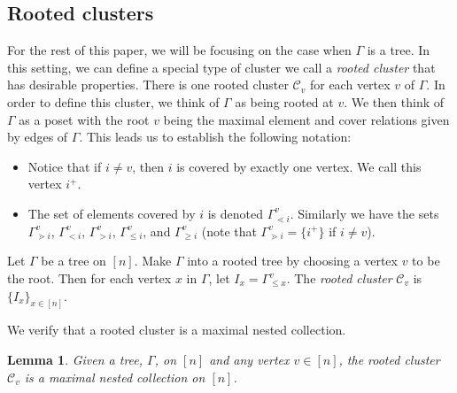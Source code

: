 \documentclass[10pt,a4paper]{amsart}
\numberwithin{equation}{section}
\newtheorem{Lemma}[Theorem]{Lemma}
\newcommand{\calC}{\mathcal{C}}
\begin{document}
\subsection{Rooted clusters}\label{sec:rooted-clusters}
For the rest of this paper, we will be focusing on the case when $\Gamma$ is a tree. In this setting, we can define a special type of cluster we call a \emph{rooted cluster} that has desirable properties. There is one rooted cluster $\calC_v$ for each vertex $v$ of $\Gamma$. In order to define this cluster, we think of $\Gamma$ as being rooted at $v$. We then think of $\Gamma$ as a poset with the root $v$ being the maximal element and cover relations given by edges of $\Gamma$. This leads us to establish the following notation:
\begin{itemize}\itemsep=0pt
 \item Notice that if $i\neq v$, then $i$ is covered by exactly one vertex. We call this vertex $i^+$.
 \item The set of elements covered by $i$ is denoted $\Gamma_{\lessdot i}^v$. Similarly we have the sets $\Gamma_{\gtrdot i}^v$, $\Gamma_{< i}^v$, $\Gamma_{> i}^v$, $\Gamma_{\leq i}^v$, and $\Gamma_{\geq i}^v$ (note that $\Gamma_{\gtrdot i}^v=\{i^+\}$ if $i\neq v$).
\end{itemize}
\begin{Definition}\label{defn:rooted-cluster}
Let $\Gamma$ be a tree on $[n]$. Make $\Gamma$ into a rooted tree by choosing a vertex $v$ to be the root. Then for each vertex $x$ in $\Gamma$, let $I_x=\Gamma_{\leq x}^v$. The \emph{rooted cluster} $\calC_v$ is $\{I_x\}_{x\in[n]}$.
\end{Definition}
We verify that a rooted cluster is a maximal nested collection.
\begin{Lemma}
Given a tree, $\Gamma$, on $[n]$ and any vertex $v \in [n]$, the rooted cluster $\calC_v$ is a maximal nested collection on $[n]$.
\end{Lemma}
\end{document}
